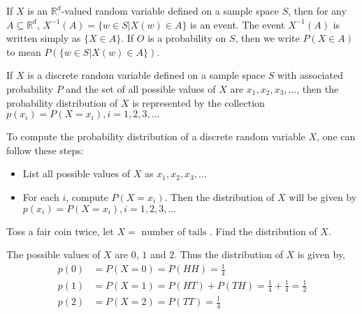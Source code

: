 If $X$ is an $\mathbb{R}^d$-valued random variable defined on a sample space
$S$, then for any $A \subseteq \mathbb{R}^d$, $X^{-1}(A) = \lbrace w \in S
\vert X(w) \in A \rbrace$ is an event. The event $X^{-1}(A)$ is written simply
as $\lbrace X \in A \rbrace$. If $O$ is a probability on $S$, then we write
$P(X \in A)$ to mean $P(\lbrace w \in S \vert X(w) \in A \rbrace)$.

\begin{definition}
    If $X$ is a discrete random variable defined on a sample space $S$ with
associated probability $P$ and the set of all possible values of $X$ are $x_1,
x_2, x_3, \dots$, then the probability distribution of $X$ is represented by
the collection $p(x_i) = P(X = x_i), i = 1, 2, 3, \dots$
\end{definition}

To compute the probability distribution of a discrete random variable $X$, one
can follow these steps:
\begin{itemize}[noitemsep, topsep=0em]
    \item List all possible values of $X$ as $x_1, x_2, x_3, \dots$
    \item For each $i$, compute $P(X = x_i)$. Then the distribution of $X$ will
          be given by $p(x_i) = P(X = x_i), i = 1, 2, 3, \dots$ 
\end{itemize}

\begin{example}
    Toss a fair coin twice, let $X = \text{ number of tails }$. Find the
distribution of $X$.
\end{example}
\begin{solution}
    The possible values of $X$ are $0$, $1$ and $2$. Thus the distribution of
$X$ is given by, 
\begin{align*}
    p(0) &= P(X = 0) = P(HH) = \frac{1}{4}                                   \\
    p(1) &= P(X = 1) = P(HT) + P(TH) = \frac{1}{4}+\frac{1}{4} = \frac{1}{2} \\
    p(2) &= P(X = 2) = P(TT) = \frac{1}{4}
\end{align*}
\end{solution}

